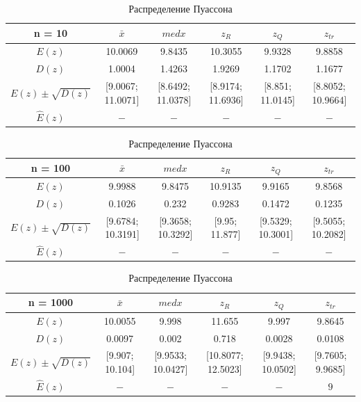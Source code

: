 \documentclass[12pt]{article}
\begin{document}
\begin{center}
\begin{table}
\end{table}

\begin{table}
\caption{Распределение Пуассона}
\begin{adjustbox}{width=\textwidth}
\begin{tabular}{| c | c | c | c | c | c |}
\hline
n = 10 & $\bar{x}$ & $med x$ & $z_R$ & $z_Q$ & $z_{tr}$ \\\hline
$E(z)$ & 10.0069 & 9.8435 & 10.3055 & 9.9328 & 9.8858 \\\hline
$D(z)$ & 1.0004 & 1.4263 & 1.9269 & 1.1702 & 1.1677 \\\hline
$E(z) \pm \sqrt{D(z)}$ & [9.0067; 11.0071] & [8.6492; 11.0378] & [8.9174; 11.6936] & [8.851; 11.0145] & [8.8052; 10.9664]\\\hline
$\hat{E}(z)$ & $ - $ & $ -  $ & $-$ & $-$ & $-$ \\\hline
\end{tabular}
\end{adjustbox}

\begin{adjustbox}{width=\textwidth}
\begin{tabular}{| c | c | c | c | c | c |}
\hline
n = 100 & $\bar{x}$ & $med x$ & $z_R$ & $z_Q$ & $z_{tr}$ \\\hline
$E(z)$ & 9.9988 & 9.8475 & 10.9135 & 9.9165 & 9.8568 \\\hline
$D(z)$ & 0.1026 & 0.232 & 0.9283 & 0.1472 & 0.1235 \\\hline
$E(z) \pm \sqrt{D(z)}$ & [9.6784; 10.3191] & [9.3658; 10.3292] & [9.95; 11.877] & [9.5329; 10.3001] & [9.5055; 10.2082]\\\hline
$\hat{E}(z)$ & $ - $ & $ -  $ & $-$ & $-$ & $-$ \\\hline
\end{tabular}
\end{adjustbox}

\begin{adjustbox}{width=\textwidth}
\begin{tabular}{| c | c | c | c | c | c |}
\hline
n = 1000 & $\bar{x}$ & $med x$ & $z_R$ & $z_Q$ & $z_{tr}$ \\\hline
$E(z)$ & 10.0055 & 9.998 & 11.655 & 9.997 & 9.8645 \\\hline
$D(z)$ & 0.0097 & 0.002 & 0.718 & 0.0028 & 0.0108 \\\hline
$E(z) \pm \sqrt{D(z)}$ & [9.907; 10.104] & [9.9533; 10.0427] & [10.8077; 12.5023] & [9.9438; 10.0502] & [9.7605; 9.9685]\\\hline
$\hat{E}(z)$ & $ - $ & $ -  $ & $-$ & $-$ & $9$ \\\hline
\end{tabular}
\end{adjustbox}


\end{table}
\end{center}
\end{document}
